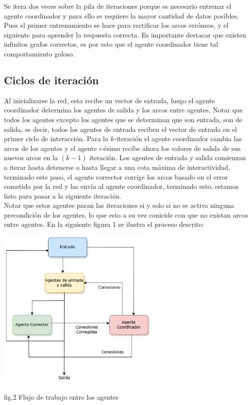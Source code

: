         Se itera dos veces sobre la pila de iteraciones porque es necesario entrenar el agente coordinador y para ello se requiere la mayor cantidad de datos posibles. Pues el primer entrenamiento se hace para rectificar los arcos erróneos, y el siguiente para aprender la respuesta correcta.
        Es importante destacar que existen infinitos grafos correctos, es por esto que el agente coordinador tiene tal comportamiento goloso.

        \subsection*{Ciclos de iteración}

         Al inicializarse la red, esta recibe un vector de entrada, luego el agente coordinador determina los agentes de salida y los arcos entre agentes. Notar que todos los agentes excepto los agentes que se determinan que son entrada, son de salida, es decir, todos los agentes de entrada reciben el vector de entrada en el primer ciclo de interacción. Para la $k$-iteración el agente coordinador cambia las arcos de los agentes y el agente $i$-ésimo recibe ahora los valores de salida de sus nuevos arcos en la $(k-1)$ iteración. Los agentes de entrada y salida comienzan a iterar hasta detenerse o hasta llegar a una cota máxima de interactividad, terminado este paso, el agente corrector corrige los arcos basado en el error cometido por la red y las envía al agente coordinador, terminado esto, estamos listo para pasar a la siguiente iteración. \\

        Notar que estos agentes paran las iteraciones si y solo si no se activa ninguna precondición de los agentes, lo que esto a su vez conicide con que no existan arcos entre agentes. En la siguiente figura 1 se ilustra el proceso descrito: \\


        \begin{center}
                \includegraphics[width=0.6\textwidth]{images/AgentArchitecture.drawio.png}
                \begin{center}
                    fig.2 Flujo de trabajo entre los agentes
                \end{center}
        \end{center}